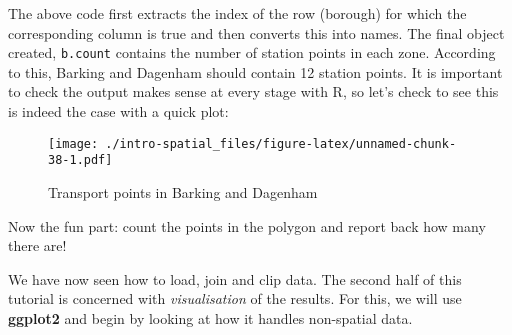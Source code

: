 \documentclass[]{article}
\newenvironment{Shaded}{}{}
\newcommand{\KeywordTok}[1]{\textcolor[rgb]{0.00,0.44,0.13}{\textbf{{#1}}}}
\newcommand{\DataTypeTok}[1]{\textcolor[rgb]{0.56,0.13,0.00}{{#1}}}
\newcommand{\DecValTok}[1]{\textcolor[rgb]{0.25,0.63,0.44}{{#1}}}
\newcommand{\StringTok}[1]{\textcolor[rgb]{0.25,0.44,0.63}{{#1}}}
\newcommand{\CommentTok}[1]{\textcolor[rgb]{0.38,0.63,0.69}{\textit{{#1}}}}
\newcommand{\OtherTok}[1]{\textcolor[rgb]{0.00,0.44,0.13}{{#1}}}
\newcommand{\NormalTok}[1]{{#1}}
\begin{document}
\begin{Shaded}
\end{Shaded}

The above code first extracts the index of the row (borough) for which
the corresponding column is true and then converts this into names. The
final object created, \texttt{b.count} contains the number of station
points in each zone. According to this, Barking and Dagenham should
contain 12 station points. It is important to check the output makes
sense at every stage with R, so let's check to see this is indeed the
case with a quick plot:

\begin{Shaded}
\end{Shaded}

\begin{figure}[htbp]
\centering
\texttt{[image: ./intro-spatial\_files/figure-latex/unnamed-chunk-38-1.pdf]}
\caption{Transport points in Barking and Dagenham}
\end{figure}

Now the fun part: count the points in the polygon and report back how
many there are!

We have now seen how to load, join and clip data. The second half of
this tutorial is concerned with \emph{visualisation} of the results. For
this, we will use \textbf{ggplot2} and begin by looking at how it
handles non-spatial data.
\end{document}

